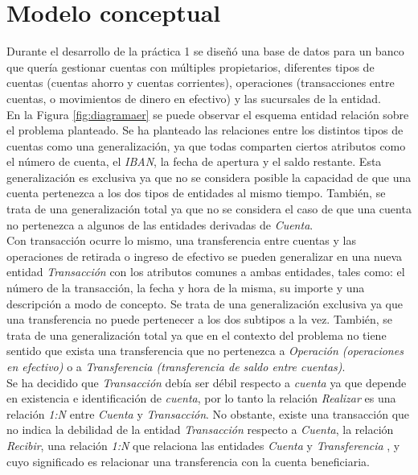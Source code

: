 \documentclass[11pt,a4paper]{article}
\begin{document}
\section{Modelo conceptual}

Durante el desarrollo de la práctica 1 se diseñó una base de datos para un banco que quería gestionar cuentas con múltiples propietarios, diferentes tipos de cuentas (cuentas ahorro y cuentas corrientes), operaciones (transacciones entre cuentas, o movimientos de dinero en efectivo) y las sucursales de la entidad.\\
En la Figura \ref{fig:diagramaer} se puede observar el esquema entidad relación sobre el problema planteado. Se ha planteado las relaciones entre los distintos tipos de cuentas como una generalización, ya que todas comparten ciertos atributos como el número de cuenta, el \emph{IBAN}, la fecha de apertura y el saldo restante. Esta generalización es exclusiva ya que no se considera posible la capacidad de que una cuenta pertenezca a los dos tipos de entidades al mismo tiempo. También, se trata de una generalización total ya que no se considera el caso de que una cuenta no pertenezca a algunos de las entidades derivadas de \emph{Cuenta}.\\
Con transacción ocurre lo mismo, una transferencia entre cuentas y las operaciones de retirada o ingreso de efectivo se pueden generalizar en una nueva entidad \emph{Transacción} con los atributos comunes a ambas entidades, tales como: el número de la transacción, la fecha y hora de la misma, su importe y una descripción a modo de concepto. Se trata de una generalización exclusiva ya que una transferencia no puede pertenecer a los dos subtipos a la vez. También, se trata de una generalización total ya que en el contexto del problema no tiene sentido que exista una transferencia que no pertenezca a \emph{Operación (operaciones en efectivo)} o a \emph{Transferencia (transferencia de saldo entre cuentas)}.\\
Se ha decidido que \emph{Transacción} debía ser débil respecto a \emph{cuenta} ya que depende en existencia e identificación de \emph{cuenta}, por lo tanto la relación \emph{Realizar} es una relación \emph{1:N} entre \emph{Cuenta} y \emph{Transacción}. No obstante, existe una transacción que no indica la debilidad de la entidad \emph{Transacción} respecto a \emph{Cuenta}, la relación \emph{Recibir}, una relación \emph{1:N} que relaciona las entidades \emph{Cuenta} y \emph{Transferencia} , y cuyo significado es relacionar una transferencia con la cuenta beneficiaria.\\
\end{document}
